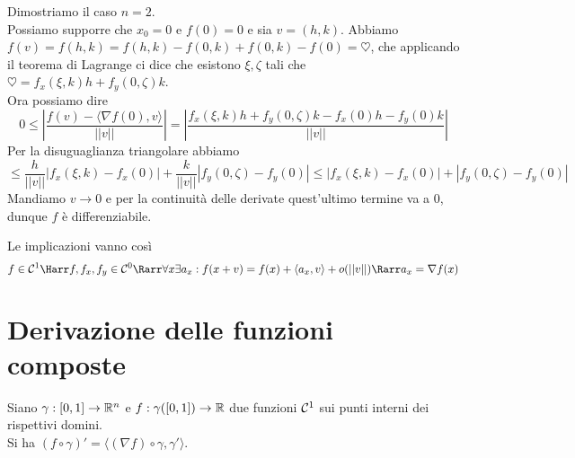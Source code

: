 \documentclass[openany]{book}
\begin{document}
    Dimostriamo il caso $n=2$.\\
    Possiamo supporre che $x_0 = 0$ e $f(0)=0$ e sia $v = (h,k)$. Abbiamo $f(v) = f(h,k) = f(h,k) - f(0, k) + f(0, k) - f(0) = \heartsuit$, che applicando il teorema di Lagrange ci dice che esistono $\xi, \zeta$ tali che $\heartsuit = f_x(\xi,k)h + f_y(0,\zeta)k$.\\
    Ora possiamo dire
    \[0\le\left|\frac{f(v) - \langle \nabla f(0), v\rangle}{||v||}\right| = \left|\frac{f_x(\xi,k)h + f_y(0,\zeta)k - f_x(0)h - f_y(0)k}{||v||}\right|\]
    Per la disuguaglianza triangolare abbiamo
    \[ \le \frac{h}{||v||}|f_x(\xi,k) - f_x(0)| + \frac{k}{||v||}|f_y(0,\zeta) - f_y(0)| \le |f_x(\xi,k) - f_x(0)| +|f_y(0,\zeta) - f_y(0)|\]
    Mandiamo $v\to 0$ e per la continuità delle derivate quest'ultimo termine va a 0, dunque $f$ è differenziabile.


\begin{remark}{}{}
    Le implicazioni vanno così
    \[f \in \mc{C}^1 \Harr f,f_x,f_y \in \mc{C}^0 \Rarr \forall x \exists a_x : f(x+v) = f(x) + \langle a_x, v\rangle + o(||v||) \Rarr a_x = \nabla f(x)\]
\end{remark}

\section{Derivazione delle funzioni composte}

\begin{theorem}{}{}
    Siano $\gamma : [0,1]\to\mathbb{R}^n$ e $f:\gamma([0,1])\to\mathbb{R}$ due funzioni $\mathcal{C}^1$ sui punti interni dei rispettivi domini.\\
    Si ha $(f\circ\gamma)' = \langle(\nabla f)\circ\gamma, \gamma'\rangle$.
\end{theorem}
\end{document}

